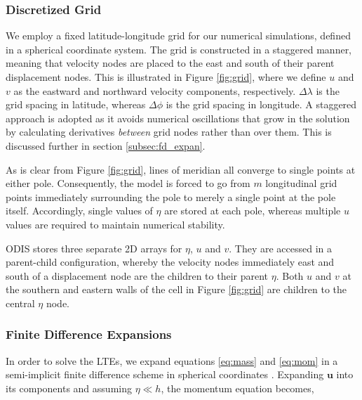 \subsubsection{Discretized Grid \label{subsec:grid}}



We employ a fixed latitude-longitude grid for our numerical simulations, defined in a spherical coordinate system. The grid is constructed in a staggered manner, meaning that velocity nodes are placed to the east and south of their parent displacement nodes. This is illustrated in Figure \ref{fig:grid}, where we define $u$ and $v$ as the eastward and northward velocity components, respectively. $\Delta \lambda$ is the grid spacing in latitude, whereas $\Delta \phi$ is the grid spacing in longitude. A staggered approach is adopted as it avoids numerical oscillations that grow in the solution by calculating derivatives \textit{between} grid nodes rather than over them. This is discussed further in section \ref{subsec:fd_expan}.

As is clear from Figure \ref{fig:grid}, lines of meridian all converge to single points at either pole. Consequently, the model is forced to go from $m$ longitudinal grid points immediately surrounding the pole to merely a single point at the pole itself. Accordingly, single values of $\eta$ are stored at each pole, whereas multiple $u$ values are required to maintain numerical stability. 

ODIS stores three separate 2D arrays for $\eta$, $u$ and $v$. They are accessed in a parent-child configuration, whereby the velocity nodes immediately east and south of a displacement node are the children to their parent $\eta$. Both $u$ and $v$ at the southern and eastern walls of the cell in Figure \ref{fig:grid} are children to the central $\eta$ node. %

\subsubsection{Finite Difference Expansions \label{subsec:fd_expan}}

In order to solve the LTEs, we expand equations \ref{eq:mass} and \ref{eq:mom} in a semi-implicit finite difference scheme in spherical coordinates \citep{sears1995tidal}. Expanding $\bm{u}$ into its components and assuming $\eta \ll h$, the momentum equation becomes,

